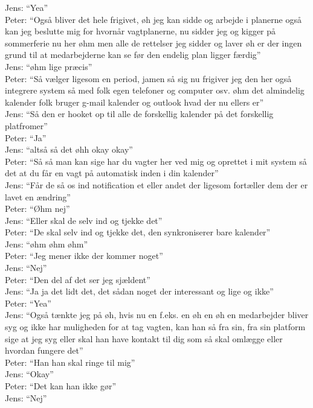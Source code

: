 Jens: “Yea”\\
Peter: “Også bliver det hele frigivet, øh jeg kan sidde og arbejde i planerne også kan jeg beslutte mig for hvornår vagtplanerne, nu sidder jeg og kigger på sommerferie nu her øhm men alle de rettelser jeg sidder og laver øh er der ingen grund til at medarbejderne kan se før den endelig plan ligger færdig”\\
Jens: “øhm lige præcis”\\
Peter: “Så vælger ligesom en period, jamen så sig nu frigiver jeg den her også integrere system så med folk egen telefoner og computer osv. øhm det almindelig kalender folk bruger g-mail kalender og outlook hvad der nu ellers er”\\
Jens: “Så den er hooket op til alle de forskellig kalender på det forskellig platfromer”\\
Peter: “Ja”\\
Jens: “altså så det øhh okay okay”\\
Peter: “Så så man kan sige har du vagter her ved mig og oprettet i mit system så det at du får en vagt på automatisk inden i din kalender”\\
Jens: “Får de så os ind notification et eller andet der ligesom fortæller dem der er lavet en ændring”\\
Peter: “Øhm nej”\\
Jens: “Eller skal de selv ind og tjekke det”\\
Peter: “De skal selv ind og tjekke det, den synkroniserer bare kalender”\\
Jens: “øhm øhm øhm”\\
Peter: “Jeg mener ikke der kommer noget” \\
Jens: “Nej”\\
Peter: “Den del af det ser jeg sjældent”\\
Jens: “Ja ja det lidt det, det sådan noget der interessant og lige og ikke”\\
Peter: “Yea”\\
Jens: “Også tænkte jeg på øh, hvis nu en f.eks. en øh en øh en medarbejder bliver syg og ikke har muligheden for at tag vagten, kan han så fra sin, fra sin platform sige at jeg syg eller skal han have kontakt til dig som så skal omlægge eller hvordan fungere det”\\
Peter: “Han han skal ringe til mig”\\
Jens: “Okay”\\
Peter: “Det kan han ikke gør”\\
Jens: “Nej”\\
